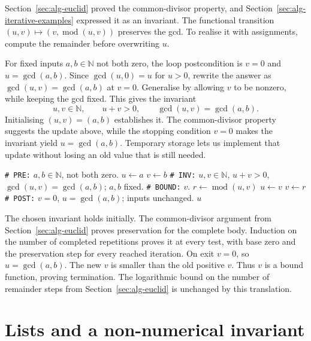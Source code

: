 Section~\ref{sec:alg-euclid} proved the common-divisor property, and
Section~\ref{sec:alg-iterative-examples} expressed it as an invariant.
The functional transition $(u,v)\mapsto(v,\operatorname{mod}(u,v))$
preserves the gcd. To realise it with assignments, compute the remainder
before overwriting $u$.

For fixed inputs $a,b\in\mathbb N$ not both zero, the loop postcondition
is $v=0$ and $u=\gcd(a,b)$. Since $\gcd(u,0)=u$ for $u>0$,
rewrite the answer as $\gcd(u,v)=\gcd(a,b)$ at $v=0$.
Generalise by allowing $v$ to be nonzero, while keeping the gcd fixed.
This gives the invariant
\[
u,v\in\mathbb N,\qquad u+v>0,\qquad \gcd(u,v)=\gcd(a,b).
\]
Initialising $(u,v)=(a,b)$ establishes it. The common-divisor property
suggests the update above, while the stopping condition $v=0$ makes the
invariant yield $u=\gcd(a,b)$. Temporary storage lets us implement that
update without losing an old value that is still needed.

\begin{algorithm}[H]
\begin{algorithmic}[1]
\Statex \texttt{\# PRE:} $a,b\in\mathbb N$, not both zero.
\State $u\leftarrow a$
\State $v\leftarrow b$
\Statex \texttt{\# INV:} $u,v\in\mathbb N$, $u+v>0$, $\gcd(u,v)=\gcd(a,b)$; $a,b$ fixed.
\Statex \texttt{\# BOUND:} $v$.
\State $r\leftarrow\operatorname{mod}(u,v)$
\State $u\leftarrow v$
\State $v\leftarrow r$
\EndWhile
\Statex \texttt{\# POST:} $v=0$, $u=\gcd(a,b)$; inputs unchanged.
\State \Return $u$
\EndProcedure
\end{algorithmic}
\caption{Preserve the gcd, using temporary storage for the remainder.}
\end{algorithm}

The chosen invariant holds initially. The common-divisor argument from
Section~\ref{sec:alg-euclid} proves preservation for the complete body. Induction
on the number of completed repetitions proves it at every test, with base
zero and the preservation step for every reached iteration.
On exit $v=0$, so $u=\gcd(a,b)$. The new $v$ is smaller than the old
positive $v$. Thus $v$ is a bound function, proving termination. The logarithmic bound on the
number of remainder steps from Section~\ref{sec:alg-euclid} is unchanged
by this translation.

\section{Lists and a non-numerical invariant}

